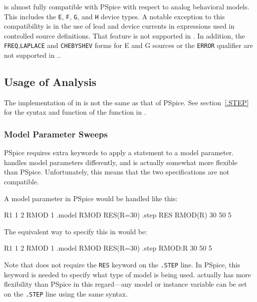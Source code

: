 \Xyce{} is almost fully compatible with PSpice with respect to analog
behavioral models.  This includes the
\texttt{E},
\texttt{F},
\texttt{G}, and
\texttt{H} 
device types.  A notable exception to this compatibility is in the use of lead and device
currents in expressions used in controlled source definitions.  That feature is not 
supported in \Xyce{}.  In addition, the \texttt{FREQ},\texttt{LAPLACE} and 
\texttt{CHEBYSHEV} forms for E and G sources or the \texttt{ERROR} qualifier are 
not supported in \Xyce{}..
  
\subsection{Usage of  Analysis}

The implementation of  in \Xyce{} is not the
same as that of PSpice.  See section~\ref{.STEP} for the syntax and
function of the  function in \Xyce{}.

\subsubsection{Model Parameter Sweeps}

PSpice requires extra keywords to apply a  statement to a
model parameter.  \Xyce{} handles model parameters differently, and is
actually somewhat more flexible than PSpice.  Unfortunately, this means
that the two specifications are not compatible.

A model parameter in PSpice would be handled like this:
\begin{vquote}
R1 1 2 RMOD 1
.model RMOD RES(R=30)
.step RES RMOD(R) 30 50 5
\end{vquote}
The equivalent way to specify this in \Xyce{} would be:
\begin{vquote}
R1 1 2 RMOD 1
.model RMOD RES(R=30)
.step RMOD:R 30 50 5
\end{vquote}
Note that \Xyce{} does not require the \texttt{RES} keyword on the
\texttt{.STEP} line.  In PSpice, this keyword is needed to specify 
what type of model is being used.  \Xyce{} actually has more flexibility
than PSpice in this regard---any model or instance variable can be set on
the \texttt{.STEP} line using the same syntax.


